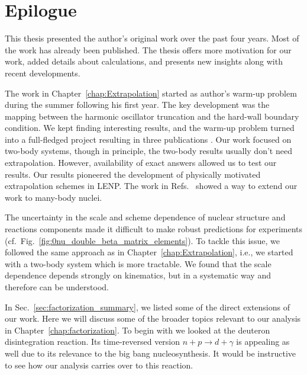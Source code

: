 \cleardoublepage
\chapter{Epilogue}

	This thesis presented the author's original work over the past four years.
	Most of the work has already been published.  The thesis offers more
	motivation for our work, added details about calculations, and
	presents new insights along with recent developments.

	The work in Chapter~\ref{chap:Extrapolation} started as author's warm-up
	problem during the summer following his first year.
	The key development was the mapping between the harmonic oscillator
	truncation and the hard-wall boundary condition.
	We kept finding
	interesting results, and the warm-up problem turned into a full-fledged
	project resulting in three publications
	\cite{More:2013rma,Furnstahl:2013vda,Konig:2014hma}.
	Our work focused on two-body systems, though in principle, the
	two-body results usually don't need extrapolation.
	However, availability of exact answers allowed us to test our results.
	Our results pioneered
	the development of physically motivated extrapolation schemes in LENP.
	The work in Refs.~\cite{Furnstahl:2014hca,Wendt:2015nba,Binder:2015trg}
	showed a way to extend our work to many-body nuclei.

	The uncertainty in the scale and scheme dependence of nuclear structure
	and reactions components made it difficult to make robust predictions
	for experiments (cf.~Fig.~\ref{fig:0nu_double_beta_matrix_elements}).
	To tackle this issue, we followed the same approach as in
	Chapter~\ref{chap:Extrapolation}, i.e., we started with a two-body
	system which is more tractable.  We found that the scale dependence
	depends strongly on kinematics, but in a systematic way and therefore
	can be understood.

	In Sec.~\ref{sec:factorization_summary}, we listed some of the direct
	extensions of our work.  Here we will discuss some of the broader topics
	relevant to our analysis in Chapter~\ref{chap:factorization}.  To
	begin with we looked at the deuteron disintegration reaction.  Its
	time-reversed version $n + p \rightarrow d + \gamma$ is appealing as
	well due to its relevance to the big bang nucleosynthesis.  It would be
	instructive to see how our analysis carries over to this reaction.


